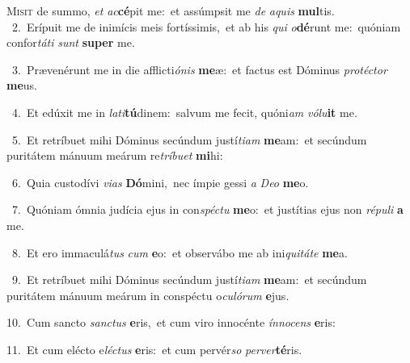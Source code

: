 \lettrine{\initial\textcolor{\initialcolor}{M}}{isit} de summo, \textit{et} \textit{ac}\-\textbf{cé}pit me:~\star et assúmpsit me \textit{de} \textit{a}\-\textit{quis} \textbf{mul}\-tis.\\
{\numbfont\textcolor{\numbcolor}{~2.}}~Erípuit me de inimícis meis fortíssimis,~\dagger et ab his \textit{qui} \textit{o}\-\textbf{dé}runt me:~\star quóniam confor\-\textit{tá}\-\textit{ti} \textit{sunt} \textbf{su}\-\textbf{per} me.\par
{\numbfont\textcolor{\numbcolor}{~3.}}~Prævenérunt me in die afflicti\-\textit{ó}\-\textit{nis} \textbf{me}\-æ:~\star et factus est Dóminus \textit{pro}\-\textit{téc}\textit{tor} \textbf{me}\-us.\par
{\numbfont\textcolor{\numbcolor}{~4.}}~Et edúxit me in \textit{la}\-\textit{ti}\textbf{tú}dinem:~\star salvum me fecit, quóni\textit{am} \textit{vó}\-\textit{lu}\textbf{it} me.\par
{\numbfont\textcolor{\numbcolor}{~5.}}~Et retríbuet mihi Dóminus secúndum justí\-\textit{ti}\-\textit{am} \textbf{me}\-am:~\star et secúndum puritátem mánuum meárum re\-\textit{trí}\-\textit{bu}\textit{et} \textbf{mi}\-hi:\par
{\numbfont\textcolor{\numbcolor}{~6.}}~Quia custodívi \textit{vi}\-\textit{as} \textbf{Dó}\-mini,~\star nec ímpie gessi \textit{a} \textit{De}\-\textit{o} \textbf{me}\-o.\par
{\numbfont\textcolor{\numbcolor}{~7.}}~Quóniam ómnia judícia ejus in con\-\textit{spéc}\-\textit{tu} \textbf{me}\-o:~\star et justítias ejus non \textit{ré}\-\textit{pu}\textit{li} \textbf{a} me.\par
{\numbfont\textcolor{\numbcolor}{~8.}}~Et ero immaculá\textit{tus} \textit{cum} \textbf{e}\-o:~\star et observábo me ab ini\-\textit{qui}\-\textit{tá}\textit{te} \textbf{me}\-a.\par
{\numbfont\textcolor{\numbcolor}{~9.}}~Et retríbuet mihi Dóminus secúndum justí\-\textit{ti}\-\textit{am} \textbf{me}\-am:~\star et secúndum puritátem mánuum meárum in conspéctu o\-\textit{cu}\-\textit{ló}\textit{rum} \textbf{e}\-jus.\par
{\numbfont\textcolor{\numbcolor}{10.}}~Cum sancto \textit{sanc}\-\textit{tus} \textbf{e}\-ris,~\star et cum viro innocénte \textit{ín}\-\textit{no}\textit{cens} \textbf{e}\-ris:\par
{\numbfont\textcolor{\numbcolor}{11.}}~Et cum elécto e\-\textit{léc}\-\textit{tus} \textbf{e}\-ris:~\star et cum pervér\textit{so} \textit{per}\-\textit{ver}\textbf{té}ris.\par
